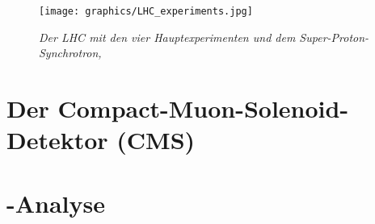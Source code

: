 \begin{figure}[hhh]
 \begin{center}
   \texttt{[image: graphics/LHC\_experiments.jpg]}
   \parbox[b]{12cm}{
     \caption[Large-Hadron-Collider]
             {\label{fig:LHC} \it Der LHC mit den vier Hauptexperimenten und dem Super-Proton-Synchrotron, \cite{Team:40525}}
   }
 \end{center}
\end{figure}

\section{Der Compact-Muon-Solenoid-Detektor (CMS)}
\label{ch:Experiment:sec:CMS}



\section{\ttH-Analyse}
\label{ch:Experiment:sec:ttH}
